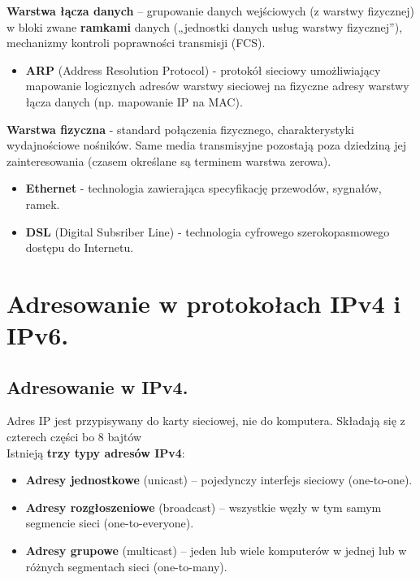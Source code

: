 \documentclass[main.tex]{subfiles}
\begin{document}
    \noindent \textbf{Warstwa łącza danych} – grupowanie danych wejściowych (z warstwy fizycznej) w bloki zwane \textbf{ramkami} danych („jednostki
    danych usług warstwy fizycznej”), mechanizmy kontroli poprawności
    transmisji (FCS).
    \begin{itemize}
        \item \textbf{ARP} (Address Resolution Protocol) - protokół sieciowy umożliwiający mapowanie logicznych
        adresów warstwy sieciowej na fizyczne adresy warstwy łącza danych (np. mapowanie IP na MAC).
    \end{itemize}

    \noindent \textbf{Warstwa fizyczna} - standard połączenia fizycznego, charakterystyki wydajnościowe nośników. Same media transmisyjne pozostają poza dziedziną jej
    zainteresowania (czasem określane są terminem warstwa zerowa).
    \begin{itemize}
        \item \textbf{Ethernet} - technologia zawierająca specyfikację przewodów, sygnałów, ramek.
        \item \textbf{DSL} (Digital Subsriber Line) - technologia cyfrowego szerokopasmowego dostępu do Internetu.
    \end{itemize}

    \newpage

    \section{Adresowanie w protokołach IPv4 i IPv6.}

    \subsection{Adresowanie w IPv4.}
    Adres IP jest przypisywany do karty sieciowej, nie do komputera. Składają się z czterech części bo 8 bajtów\\

    \noindent Istnieją \textbf{trzy typy adresów IPv4}:
    \begin{itemize}
        \item \textbf{Adresy jednostkowe} (unicast) – pojedynczy interfejs sieciowy (one-to-one).
        \item \textbf{Adresy rozgłoszeniowe} (broadcast) – wszystkie węzły w tym samym segmencie sieci (one-to-everyone).
        \item \textbf{Adresy grupowe} (multicast) – jeden lub wiele komputerów w jednej lub w różnych segmentach sieci (one-to-many).
    \end{itemize}
\end{document}
